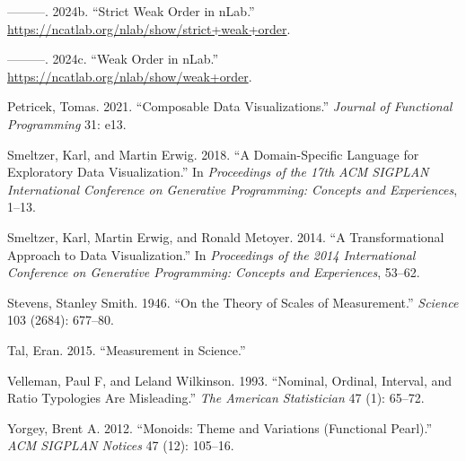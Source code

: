 \documentclass[
]{book}
\newlength{\cslhangindent}
\newlength{\cslentryspacingunit} %
\newenvironment{CSLReferences}[2] %
 {%
  \setlength{\parindent}{0pt}
  \ifodd #1
  \let\oldpar\par
  \def\par{\hangindent=\cslhangindent\oldpar}
  \fi
  \setlength{\parskip}{#2\cslentryspacingunit}
 }%
 {}
\theoremstyle{definition}
\theoremstyle{definition}
\theoremstyle{definition}
\theoremstyle{definition}
\theoremstyle{remark}
\begin{document}
\begin{CSLReferences}{1}{0}
\leavevmode{}%
---------. 2024b. {``Strict Weak Order in nLab.''} \url{https://ncatlab.org/nlab/show/strict+weak+order}.

\leavevmode{}%
---------. 2024c. {``Weak Order in nLab.''} \url{https://ncatlab.org/nlab/show/weak+order}.

\leavevmode{}%
Petricek, Tomas. 2021. {``Composable Data Visualizations.''} \emph{Journal of Functional Programming} 31: e13.

\leavevmode{}%
Smeltzer, Karl, and Martin Erwig. 2018. {``A Domain-Specific Language for Exploratory Data Visualization.''} In \emph{Proceedings of the 17th ACM SIGPLAN International Conference on Generative Programming: Concepts and Experiences}, 1--13.

\leavevmode{}%
Smeltzer, Karl, Martin Erwig, and Ronald Metoyer. 2014. {``A Transformational Approach to Data Visualization.''} In \emph{Proceedings of the 2014 International Conference on Generative Programming: Concepts and Experiences}, 53--62.

\leavevmode{}%
Stevens, Stanley Smith. 1946. {``On the Theory of Scales of Measurement.''} \emph{Science} 103 (2684): 677--80.

\leavevmode{}%
Tal, Eran. 2015. {``Measurement in Science.''}

\leavevmode{}%
Velleman, Paul F, and Leland Wilkinson. 1993. {``Nominal, Ordinal, Interval, and Ratio Typologies Are Misleading.''} \emph{The American Statistician} 47 (1): 65--72.

\leavevmode{}%
Yorgey, Brent A. 2012. {``Monoids: Theme and Variations (Functional Pearl).''} \emph{ACM SIGPLAN Notices} 47 (12): 105--16.

\end{CSLReferences}
\end{document}
